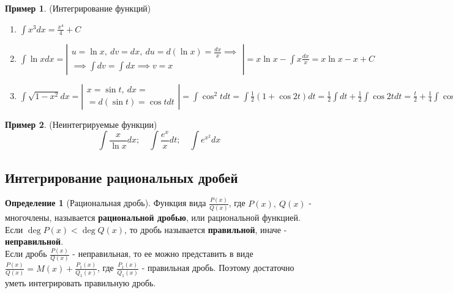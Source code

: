 \documentclass{report}
\theoremstyle{definition}
\newtheorem{definition}{Определение}[section]
\newtheorem{example}{Пример}
\begin{document}
\begin{example}
  (Интегрирование функций)
  \begin{enumerate}
    \item \(\int x^{3} dx = \frac{x^{4}}{4} + C\)
    \item \(\int \ln x dx =
          \left|
          \begin{array}{c}
            u = \ln x, \ dv = dx, \ du = d(\ln x) = \frac{dx}{x} \implies \\
            \implies \int dv = \int dx \implies v = x
          \end{array}
          \right| = x \ln x - \int x \frac{dx}{x} = x \ln x - x + C\)
    \item \(\int \sqrt{1 - x^{2}} dx =
          \left|
          \begin{array}{c}
            x = \sin t, \ dx = \\
            = d(\sin t) = \cos t dt
          \end{array}
          \right| = \int \cos^{2} t dt = \int \frac{1}{2}(1 + \cos 2t) dt = \frac{1}{2} \int dt + \frac{1}{2} \int \cos 2t dt =
          \frac{t}{2} + \frac{1}{4} \int \cos 2t d(2t) = \frac{t}{2} + \frac{1}{4} \sin 2t + C = \frac{\arcsin x}{2} +
          \frac{1}{2} x \sqrt{1 - x^{2}} + C\)
  \end{enumerate}
\end{example}

\begin{example}
  (Неинтегрируемые функции)
  \begin{equation*}
    \int \frac{x}{\ln x} dx; \quad \int \frac{e^{x}}{x} dt; \quad \int e^{x^{2}} dx
  \end{equation*}
\end{example}

\subsection{Интегрирование рациональных дробей}

\begin{definition}[Рациональная дробь]
  Функция вида \(\frac{P(x)}{Q(x)}\), где \(P(x), \ Q(x)\) - многочлены, называется \textbf{рациональной дробью},
  или рациональной функцией. \\
  Если \(\deg P(x) < \deg Q(x)\), то дробь называется \textbf{правильной}, иначе - \textbf{неправильной}. \\
  Если дробь \(\frac{P(x)}{Q(x)}\) - неправильная, то ее можно представить в виде \(\frac{P(x)}{Q(x)} = M(x) +
  \frac{P_{1}(x)}{Q_{1}(x)}\), где \(\frac{P_{1}(x)}{Q_{1}(x)}\) - правильная дробь. Поэтому достаточно уметь
  интегрировать правильную дробь.
\end{definition}
\end{document}
